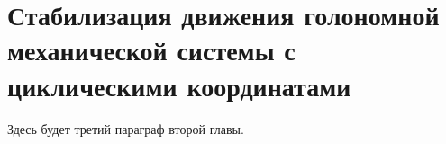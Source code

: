 \section{Стабилизация движения голономной механической системы с циклическими координатами} \label{p23}

Здесь будет третий параграф второй главы.